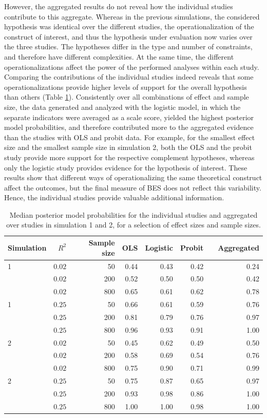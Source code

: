 \documentclass[11pt,reqno]{article}
\begin{document}
However, the aggregated results do not reveal how the individual studies contribute to this aggregate.
Whereas in the previous simulations, the considered hypothesis was identical over the different studies, the operationalization of the construct of interest, and thus the hypothesis under evaluation now varies over the three studies.
The hypotheses differ in the type and number of constraints, and therefore have different complexities.
At the same time, the different operationalizations affect the power of the performed analyses within each study.
Comparing the contributions of the individual studies indeed reveals that some operationalizations provide higher levels of support for the overall hypothesis than others (Table \ref{pmp-studies}).
Consistently over all combinations of effect and sample size, the data generated and analyzed with the logistic model, in which the separate indicators were averaged as a scale score, yielded the highest posterior model probabilities, and therefore contributed more to the aggregated evidence than the studies with OLS and probit data.
For example, for the smallest effect size and the smallest sample size in simulation 2, both the OLS and the probit study provide more support for the respective complement hypotheses, whereas only the logistic study provides evidence for the hypothesis of interest.
These results show that different ways of operationalizing the same theoretical construct affect the outcomes, but the final measure of BES does not reflect this variability. Hence, the individual studies provide valuable additional information.


\begin{table}[t]
\caption{Median posterior model probabilities for the individual studies and aggregated over studies in simulation 1 and 2, for a selection of effect sizes and sample sizes.}
\label{pmp-studies}
\centering
\begin{tabular}{lrrrrrrr}
\hline
Simulation & $R^2$ & Sample size & OLS & Logistic & Probit & & Aggregated \\
\hline
1 & $0.02$ & 50 & 0.44 & 0.43 & 0.42 & & 0.24 \\
  & $0.02$ & 200 & 0.52 & 0.50 & 0.50 & & 0.42 \\
  & $0.02$ & 800 & 0.65 & 0.61 & 0.62 & & 0.78 \\
\hline
1 & $0.25$ & 50 & 0.66 & 0.61 & 0.59 & & 0.76 \\
  & $0.25$ & 200 & 0.81 & 0.79 & 0.76 & & 0.97 \\
  & $0.25$ & 800 & 0.96 & 0.93 & 0.91 & & 1.00 \\
\hline
2 & $0.02$ & 50 & 0.45 & 0.62 & 0.49 & & 0.50 \\
  & $0.02$ & 200 & 0.58 & 0.69 & 0.54 & & 0.76 \\
  & $0.02$ & 800 & 0.75 & 0.90 & 0.71 & & 0.99 \\
\hline
2 & $0.25$ & 50 & 0.75 & 0.87 & 0.65 & & 0.97 \\
  & $0.25$ & 200 & 0.93 & 0.98 & 0.86 & & 1.00 \\
  & $0.25$ & 800 & 1.00 & 1.00 & 0.98 & & 1.00 \\
\hline
\end{tabular}
\end{table}
\end{document}
